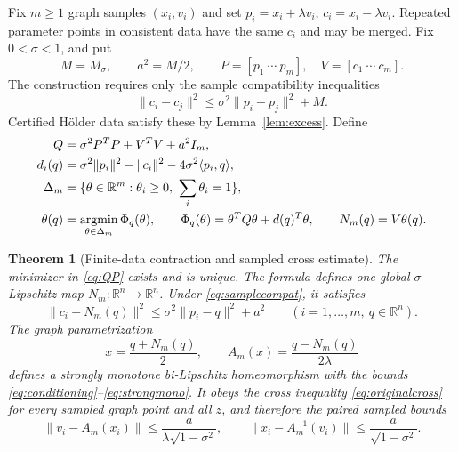 \documentclass[11pt]{article}
\numberwithin{equation}{section}
\newtheorem{theorem}{Theorem}[section]
\theoremstyle{definition}
\theoremstyle{remark}
\newcommand{\R}{\mathbb R}
\newcommand{\ip}[2]{\langle #1,#2\rangle}
\newcommand{\norm}[1]{\lVert #1\rVert}
\DeclareMathOperator*{\argmin}{argmin}
\begin{document}
Fix $m\ge1$ graph samples $(x_i,v_i)$ and set
$p_i=x_i+\lambda v_i$, $c_i=x_i-\lambda v_i$. Repeated parameter
points in consistent data have the same $c_i$ and may be merged. Fix
$0<\sigma<1$, and put
\begin{equation}\label{eq:finiteconstants}
 M=M_\sigma,\qquad a^2=M/2,
 \qquad P=[p_1\ \cdots\ p_m],\quad V=[c_1\ \cdots\ c_m].
\end{equation}
The construction requires only the sample compatibility inequalities
\begin{equation}\label{eq:samplecompat}
 \norm{c_i-c_j}^2\le\sigma^2\norm{p_i-p_j}^2+M.
\end{equation}
Certified H\"older data satisfy these by Lemma~\ref{lem:excess}. Define
\begin{align}
 Q&=\sigma^2P^TP+V^TV+a^2I_m,\label{eq:Q}\\
 d_i(q)&=\sigma^2\norm{p_i}^2-\norm{c_i}^2
              -4\sigma^2\ip{p_i}{q},\label{eq:d}\\
 \Delta_m&=\{\theta\in\R^m:\theta_i\ge0,\ \sum_i\theta_i=1\},\notag\\
 \theta(q)&=\argmin_{\theta\in\Delta_m}
           \Phi_q(\theta),\qquad
 \Phi_q(\theta)=\theta^TQ\theta+d(q)^T\theta,
 \qquad N_m(q)=V\theta(q).\label{eq:QP}
\end{align}

\begin{theorem}[Finite-data contraction and sampled cross estimate]
\label{thm:finite_qp}
The minimizer in \eqref{eq:QP} exists and is unique. The formula defines
one global $\sigma$-Lipschitz map $N_m:\R^n\to\R^n$. Under
\eqref{eq:samplecompat}, it satisfies
\begin{equation}\label{eq:samplecross}
 \norm{c_i-N_m(q)}^2
 \le\sigma^2\norm{p_i-q}^2+a^2
 \qquad(i=1,\ldots,m,\ q\in\R^n).
\end{equation}
The graph parametrization
\begin{equation}\label{eq:Am}
 x=\frac{q+N_m(q)}2,\qquad
 A_m(x)=\frac{q-N_m(q)}{2\lambda}
\end{equation}
defines a strongly monotone bi-Lipschitz homeomorphism with the bounds
\eqref{eq:conditioning}--\eqref{eq:strongmono}. It obeys the cross
inequality \eqref{eq:originalcross} for every sampled graph point and
all $z$, and therefore the paired sampled bounds
\begin{equation}\label{eq:samplepaired}
 \norm{v_i-A_m(x_i)}\le\frac{a}{\lambda\sqrt{1-\sigma^2}},
 \qquad
 \norm{x_i-A_m^{-1}(v_i)}\le\frac{a}{\sqrt{1-\sigma^2}}.
\end{equation}
\end{theorem}
\end{document}
